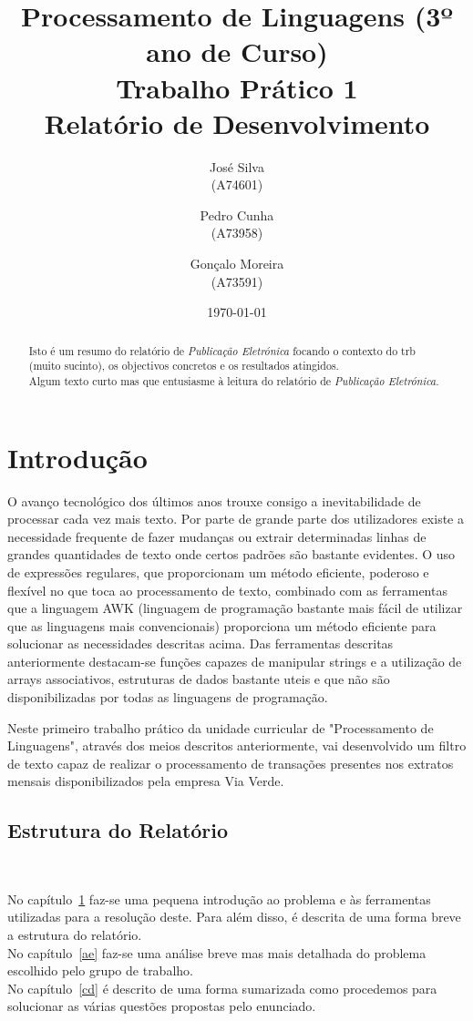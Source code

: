 \documentclass{report}
\title{Processamento de Linguagens (3º ano de Curso)\\ \textbf{Trabalho Prático 1}\\ Relatório de Desenvolvimento}
\author{José Silva\\ (A74601) \and Pedro Cunha\\ (A73958) \and Gonçalo Moreira\\ (A73591) }
\date{\today}
\def\pe{\emph{Publicação Eletrónica}\xspace}
\begin{document}
\maketitle

\begin{abstract}
Isto é um resumo do relatório de \pe focando o contexto do trb (muito sucinto),
os objectivos concretos e os resultados atingidos.\\
Algum texto curto mas que entusiasme à leitura do relatório de \pe.
\end{abstract}

\tableofcontents


\chapter{Introdução} \label{intro}

O avanço tecnológico dos últimos anos trouxe consigo a inevitabilidade de processar cada vez mais texto.
Por parte de grande parte dos utilizadores existe a necessidade frequente de fazer mudanças ou extrair determinadas
linhas de grandes quantidades de texto onde certos padrões são bastante evidentes.
O uso de expressões regulares, que proporcionam um método eficiente, poderoso e flexível no que toca ao processamento de texto,
combinado com as ferramentas que a linguagem AWK (linguagem de programação bastante mais fácil de utilizar que as linguagens mais
convencionais) proporciona um método eficiente para solucionar as necessidades descritas acima. Das ferramentas descritas anteriormente
destacam-se funções capazes de manipular strings e a utilização de arrays associativos, estruturas de dados bastante uteis e que não são
disponibilizadas por todas as linguagens de programação.

Neste primeiro trabalho prático da unidade curricular de "Processamento de Linguagens", através dos meios descritos anteriormente,
vai desenvolvido um filtro de texto capaz de realizar o processamento de transações presentes nos extratos mensais disponibilizados
pela empresa Via Verde.


\section*{Estrutura do Relatório} \

No capítulo~\ref{intro} faz-se uma pequena introdução ao problema e às ferramentas utilizadas para a resolução deste.
Para além disso, é descrita de uma forma breve a estrutura do relatório.\\
No capítulo~\ref{ae} faz-se uma análise breve mas mais detalhada do problema escolhido pelo grupo de trabalho.\\
No capítulo~\ref{cd} é descrito de uma forma sumarizada como procedemos para solucionar as várias questões propostas pelo enunciado.
\end{document}

